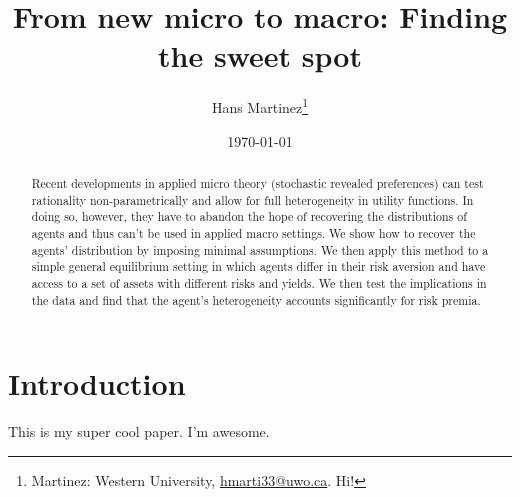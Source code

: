 \documentclass[AER]{AEA}
\begin{document}
\title{From new micro to macro: Finding the sweet spot}



\author{
  Hans Martinez\thanks{
  Martinez: Western
University, \href{mailto:hmarti33@uwo.ca}{hmarti33@uwo.ca}.
  Hi!
}
}

\date{\today}

\begin{abstract}
Recent developments in applied micro theory (stochastic revealed
preferences) can test rationality non-parametrically and allow for full
heterogeneity in utility functions. In doing so, however, they have to
abandon the hope of recovering the distributions of agents and thus
can't be used in applied macro settings. We show how to recover the
agents' distribution by imposing minimal assumptions. We then apply this
method to a simple general equilibrium setting in which agents differ in
their risk aversion and have access to a set of assets with different
risks and yields. We then test the implications in the data and find
that the agent's heterogeneity accounts significantly for risk premia.
\end{abstract}


\maketitle

\hypertarget{introduction}{%
\section*{Introduction}\label{introduction}}

This is my super cool paper. I'm awesome.
\end{document}
